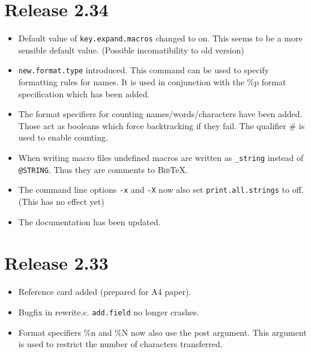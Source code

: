 \documentclass[11pt,a4paper]{scrartcl}
\newcommand\Arg[1]{\texttt{#1}}
\newcommand\rsc[1]{\texttt{#1}}
\newcommand\File[1]{\textsf{#1}}
\newcommand\BibTeX{\textsc{Bib}\TeX}
\newenvironment{Release}[2]{\section*{Release #1}\begin{itemize}}{\end{itemize}}
\newenvironment{Fix}[1]{\item }{}
\newenvironment{New}[1]{\item }{}
\newenvironment{Doc}[1]{\item }{}
\newenvironment{Update}[1]{\item }{}
\begin{document}
 \begin{Release}{2.34}{}
  \begin{Update}{gene}
    Default value of \rsc{key.expand.macros} changed to on. This seems
    to be a more sensible default value. (Possible incomatibility to old
    version)
  \end{Update}
  \begin{New}{gene}
    \rsc{new.format.type} introduced. This command can be used to
    specify formatting rules for names. It is used in conjunction with the \%p
    format specification which has been added.
  \end{New}
  \begin{New}{gene}
    The format specifiers for counting names/words/characters have been added.
    Those act as booleans which force backtracking if they fail. The qualifier
    \# is used to enable counting.
  \end{New}
  \begin{Update}{gene}
    When writing macro files undefined macros are written as
    \verb|_string| instead of \verb|@STRING|. Thus they are
    comments to \BibTeX{}.
  \end{Update}
  \begin{Update}{gene}
    The command line options \Arg{-x} and \Arg{-X} now also set
    \rsc{print.all.strings} to off. (This has no effect yet)
  \end{Update}
  \begin{Doc}{gene}
    The documentation has been updated.
  \end{Doc}
 \end{Release}

 \begin{Release}{2.33}{}
  \begin{New}{gene}
    Reference card added (prepared for A4 paper).
  \end{New}
  \begin{Fix}{gene}
    Bugfix in \File{rewrite.c}. \rsc{add.field} no longer crashes.
  \end{Fix}
  \begin{Update}{gene}
    Format specifiers \%n and \%N now also use the post argument. This
    argument is used to restrict the number of characters transferred.
  \end{Update}
 \end{Release}
\end{document}
